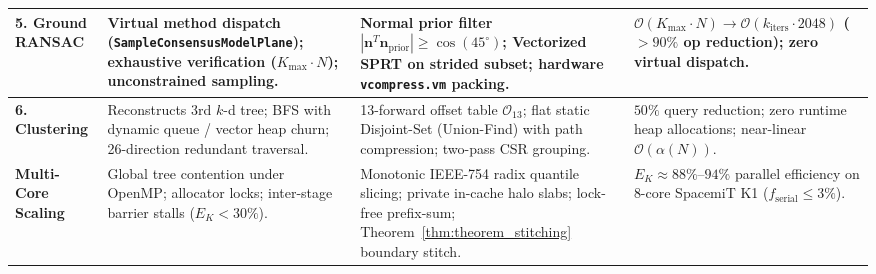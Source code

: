 \documentclass[11pt,a4paper]{article}
\begin{document}
\begin{table}[ht]
\begin{tabular}{@{}p{2.2cm}p{4.2cm}p{5.5cm}p{3.1cm}@{}}
\textbf{5. Ground RANSAC} &
Virtual method dispatch (\texttt{SampleConsensusModelPlane}); exhaustive verification ($K_{\max} \cdot N$); unconstrained sampling. &
Normal prior filter $|\bm{n}^T \bm{n}_{\text{prior}}| \ge \cos(45^\circ)$; Vectorized SPRT on strided subset; hardware \texttt{vcompress.vm} packing. &
$\mathcal{O}(K_{\max} \cdot N) \to \mathcal{O}(k_{\text{iters}} \cdot 2048)$ ($>90\%$ op reduction); zero virtual dispatch. \\ \midrule
\textbf{6. Clustering} &
Reconstructs 3rd $k$-d tree; BFS with dynamic queue / vector heap churn; 26-direction redundant traversal. &
13-forward offset table $\mathcal{O}_{13}$; flat static Disjoint-Set (Union-Find) with path compression; two-pass CSR grouping. &
$50\%$ query reduction; zero runtime heap allocations; near-linear $\mathcal{O}(\alpha(N))$. \\ \midrule
\textbf{Multi-Core Scaling} &
Global tree contention under OpenMP; allocator locks; inter-stage barrier stalls ($E_K < 30\%$). &
Monotonic IEEE-754 radix quantile slicing; private in-cache halo slabs; lock-free prefix-sum; Theorem~\ref{thm:theorem_stitching} boundary stitch. &
$E_K \approx 88\%\text{--}94\%$ parallel efficiency on 8-core SpacemiT K1 ($f_{\text{serial}} \le 3\%$). \\ \bottomrule
\end{tabular}
\end{table}
\end{document}
